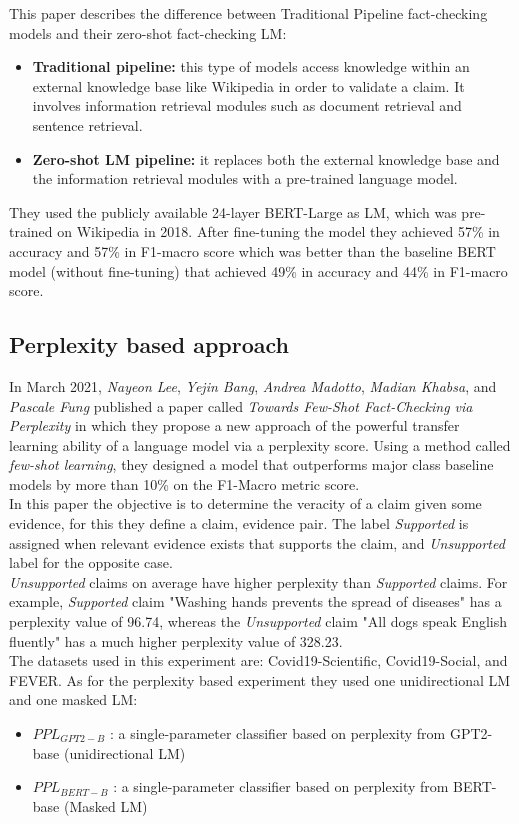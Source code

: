 \documentclass[conference]{IEEEtran}
\begin{document}
This paper describes the difference between Traditional Pipeline fact-checking models and their zero-shot fact-checking LM:

\begin{itemize}
\item \textbf{Traditional pipeline:} this type of models access knowledge within an external knowledge base like Wikipedia in order to validate a claim. It involves information retrieval modules such as document retrieval and sentence retrieval.
\item \textbf{Zero-shot LM pipeline:} it replaces both the external knowledge base and the information retrieval modules with a pre-trained language model.\\
\end{itemize}

They used the publicly available 24-layer BERT-Large as LM, which was pre-trained on Wikipedia in 2018. After fine-tuning the model they achieved 57\% in accuracy and 57\% in F1-macro score which was better than the baseline BERT model (without fine-tuning) that achieved 49\% in accuracy and 44\% in F1-macro score.

\subsection{Perplexity based approach \cite{lee2021towards} \cite{lee2020misinformation}}
In March 2021, \textit{Nayeon Lee}, \textit{Yejin Bang}, \textit{Andrea Madotto}, \textit{Madian Khabsa}, and \textit{Pascale Fung} published a paper called \textit{Towards Few-Shot Fact-Checking via Perplexity} in which they propose a new approach of the powerful transfer learning ability of a language model via a perplexity score. Using a method called \textit{few-shot learning}, they designed a model that outperforms major class baseline models by more than 10\% on the F1-Macro metric score.\\
In this paper the objective is to determine the veracity of a claim given some evidence, for this they define a {claim, evidence} pair. The label \emph{Supported} is assigned when relevant evidence exists that supports the claim, and \emph{Unsupported} label for the opposite case.\\
\emph{Unsupported} claims on average have higher perplexity than \emph{Supported} claims. For example, \emph{Supported} claim "Washing hands prevents the spread of diseases" has a perplexity value of 96.74, whereas the \emph{Unsupported} claim "All dogs speak English fluently" has a much higher perplexity value of 328.23.\\
The datasets used in this experiment are: Covid19-Scientific, Covid19-Social, and FEVER. As for the perplexity based experiment they used one unidirectional LM and one masked LM:
\begin{itemize}
\item $PPL_{GPT2-B}$ : a single-parameter classifier based on perplexity from GPT2-base \cite{radford2019language} (unidirectional LM)
\item $PPL_{BERT-B}$ : a single-parameter classifier based on perplexity from BERT-base \cite{devlin2018bert} (Masked LM)\\
\end{itemize}
\end{document}
